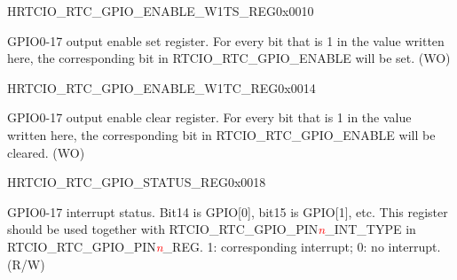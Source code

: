\begin{register}{H}{RTCIO\_RTC\_GPIO\_ENABLE\_W1TS\_REG}{0x0010}\label{regdesc:RTCIORTCGPIOENABLEW1TSREG}
%
%
\regnewline%
\begin{regdesc}\begin{reglist}
\item [RTCIO\_RTC\_GPIO\_ENABLE\_W1TS]GPIO0-17 output enable set register. For every bit that is 1 in the value written here, the corresponding bit in RTCIO\_RTC\_GPIO\_ENABLE will be set. (WO)
\end{reglist}\end{regdesc}
\end{register}


\begin{register}{H}{RTCIO\_RTC\_GPIO\_ENABLE\_W1TC\_REG}{0x0014}\label{regdesc:RTCIORTCGPIOENABLEW1TCREG}
%
%
\regnewline%
\begin{regdesc}\begin{reglist}
\item [RTCIO\_RTC\_GPIO\_ENABLE\_W1TC]GPIO0-17 output enable clear register. For every bit that is 1 in the value written here, the corresponding bit in RTCIO\_RTC\_GPIO\_ENABLE will be cleared. (WO)
\end{reglist}\end{regdesc}
\end{register}


\begin{register}{H}{RTCIO\_RTC\_GPIO\_STATUS\_REG}{0x0018}\label{regdesc:RTCIORTCGPIOSTATUSREG}
%
%
\regnewline%
\begin{regdesc}\begin{reglist}
\item [RTCIO\_RTC\_GPIO\_STATUS\_INT]GPIO0-17 interrupt status. Bit14 is GPIO[0], bit15 is GPIO[1], etc. This register should be used together with RTCIO\_RTC\_GPIO\_PIN\textcolor{red}{\it{n}}\_INT\_TYPE in RTCIO\_RTC\_GPIO\_PIN\textcolor{red}{\it{n}}\_REG. 1: corresponding interrupt; 0: no interrupt. (R/W)
\end{reglist}\end{regdesc}
\end{register}


